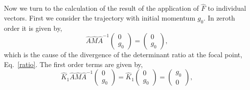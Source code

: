 \documentclass[journal=jpcafh,manuscript=article]{achemso}
\begin{document}
Now we turn to the calculation of the result of the application of
$\hat{F}$ to individual vectors. First we consider the trajectory with
initial momentum $g_0$. In zeroth order it is given by,
\begin{equation}
  \label{b14}
  \hat{A}\hat{M}\hat{A}^{-1}\left(\begin{array}{c}0\\g_0\end{array}\right)
  =\left(\begin{array}{c}0\\g_0\end{array}\right),
\end{equation}
which is the cause of the divergence of the determinant ratio at the
focal point, Eq.~\ref{ratio}. The first order terms are given
by,
\begin{equation}
  \label{b15}
  \hat{K}_1\hat{A}\hat{M}\hat{A}^{-1}\left(\begin{array}{c}0\\g_0\end{array}\right)
  =\hat{K}_1\left(\begin{array}{c}0\\g_0\end{array}\right)
  =\left(\begin{array}{c}g_0\\0\end{array}\right),
\end{equation}
\end{document}
